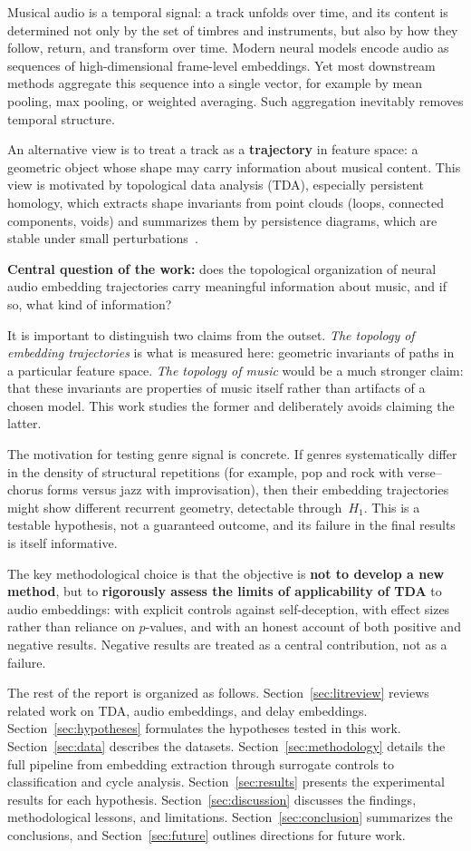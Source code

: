 Musical audio is a temporal signal: a track unfolds over time, and its content is determined not only by the set of timbres and instruments, but also by how they follow, return, and transform over time. Modern neural models encode audio as sequences of high-dimensional frame-level embeddings. Yet most downstream methods aggregate this sequence into a single vector, for example by mean pooling, max pooling, or weighted averaging. Such aggregation inevitably removes temporal structure.

An alternative view is to treat a track as a \textbf{trajectory} in feature space: a geometric object whose shape may carry information about musical content. This view is motivated by topological data analysis (TDA), especially persistent homology, which extracts shape invariants from point clouds (loops, connected components, voids) and summarizes them by persistence diagrams, which are stable under small perturbations~\cite{cohen2007stability}.

\textbf{Central question of the work:} does the topological organization of neural audio embedding trajectories carry meaningful information about music, and if so, what kind of information?

It is important to distinguish two claims from the outset. \emph{The topology of embedding trajectories} is what is measured here: geometric invariants of paths in a particular feature space. \emph{The topology of music} would be a much stronger claim: that these invariants are properties of music itself rather than artifacts of a chosen model. This work studies the former and deliberately avoids claiming the latter.

The motivation for testing genre signal is concrete. If genres systematically differ in the density of structural repetitions (for example, pop and rock with verse--chorus forms versus jazz with improvisation), then their embedding trajectories might show different recurrent geometry, detectable through~$H_1$. This is a testable hypothesis, not a guaranteed outcome, and its failure in the final results is itself informative.

The key methodological choice is that the objective is \textbf{not to develop a new method}, but to \textbf{rigorously assess the limits of applicability of TDA} to audio embeddings: with explicit controls against self-deception, with effect sizes rather than reliance on $p$-values, and with an honest account of both positive and negative results. Negative results are treated as a central contribution, not as a failure.

The rest of the report is organized as follows. Section~\ref{sec:litreview} reviews related work on TDA, audio embeddings, and delay embeddings. Section~\ref{sec:hypotheses} formulates the hypotheses tested in this work. Section~\ref{sec:data} describes the datasets. Section~\ref{sec:methodology} details the full pipeline from embedding extraction through surrogate controls to classification and cycle analysis. Section~\ref{sec:results} presents the experimental results for each hypothesis. Section~\ref{sec:discussion} discusses the findings, methodological lessons, and limitations. Section~\ref{sec:conclusion} summarizes the conclusions, and Section~\ref{sec:future} outlines directions for future work.
